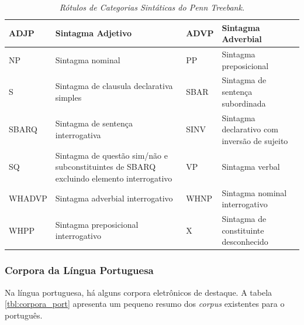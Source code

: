 \begin{table}
   \centering
   \small
   \caption{\it Rótulos de Categorias Sintáticas do \emph{Penn Treebank}.}

   \begin{tabular}{ | p{2cm} | p{4cm} | p{2cm} | p{4cm} |}

   \hline
		ADJP & Sintagma Adjetivo 	& 	ADVP & Sintagma Adverbial\\
   \hline
		NP & Sintagma nominal 	& 	PP & Sintagma preposicional\\
   \hline
		S & Sintagma de clausula declarativa simples 	& 	SBAR & Sintagma de sentença subordinada\\
   \hline
		SBARQ & Sintagma de sentença interrogativa 	& 	SINV & Sintagma declarativo com inversão de sujeito\\
   \hline
		SQ & Sintagma de questão sim/não e subconstituintes de SBARQ excluindo elemento interrogativo 	& 	 VP & Sintagma verbal\\
   \hline
		WHADVP & Sintagma adverbial interrogativo 	& 	WHNP & Sintagma nominal interrogativo\\
   \hline
		WHPP & Sintagma preposicional interrogativo &    	X & Sintagma de constituinte desconhecido \\
	\hline

   \end{tabular}
   \label{tbl:penn_treebank_cats}
\end{table}

\subsubsection{Corpora da Língua Portuguesa}
\label{sub:corpus_portugues}

Na língua portuguesa, há alguns corpora eletrônicos de destaque. A tabela \ref{tbl:corpora_port} apresenta um pequeno resumo dos \emph{corpus} existentes para o português.

